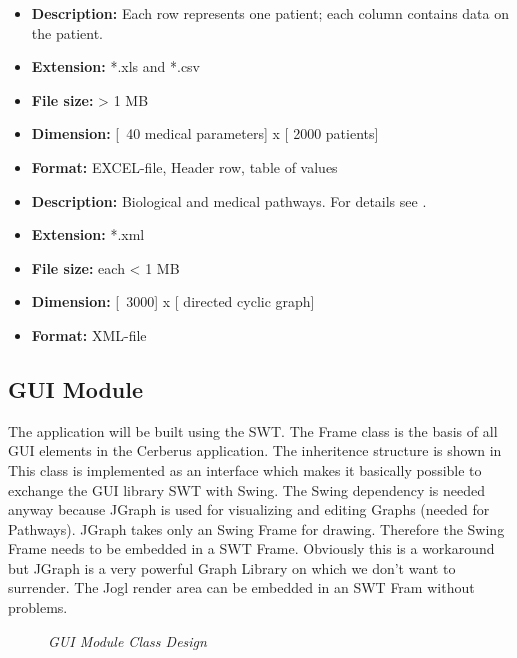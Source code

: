 
\begin{itemize}
\item \textbf{Description: } Each row represents one patient; each column contains data on the patient.
\item \textbf{Extension: } *.xls  and  *.csv
\item \textbf{File size: } > 1 MB
\item \textbf{Dimension: } [~40 medical parameters] x [ 2000 patients]
\item \textbf{Format: } EXCEL-file, Header row, table of values
\end{itemize}


\begin{itemize}
\item \textbf{Description: } Biological and medical pathways. For details see .
\item \textbf{Extension: } *.xml
\item \textbf{File size: } each < 1 MB
\item \textbf{Dimension: } [~3000] x [ directed cyclic graph]
\item \textbf{Format: } XML-file
\end{itemize}

\subsection{GUI Module}

The application will be built using the SWT. 
The Frame class is the basis of all GUI elements in the Cerberus application.
The inheritence structure is shown in  
This class is implemented as an interface which makes it basically possible to exchange the GUI library SWT with Swing.
The Swing dependency is needed anyway because JGraph is used for visualizing and editing Graphs (needed for Pathways).
JGraph takes only an Swing Frame for drawing. Therefore the Swing Frame needs to be embedded in a SWT Frame.
Obviously this is a workaround but JGraph is a very powerful Graph Library on which we don't want to surrender.
The Jogl render area can be embedded in an SWT Fram without problems.

\begin{figure}[ht]
\centering
{} 
\caption[GUI Module Class Design]{\textit{GUI Module Class Design}} 
\label{gfx:gui_module_class_design}
\end{figure}

